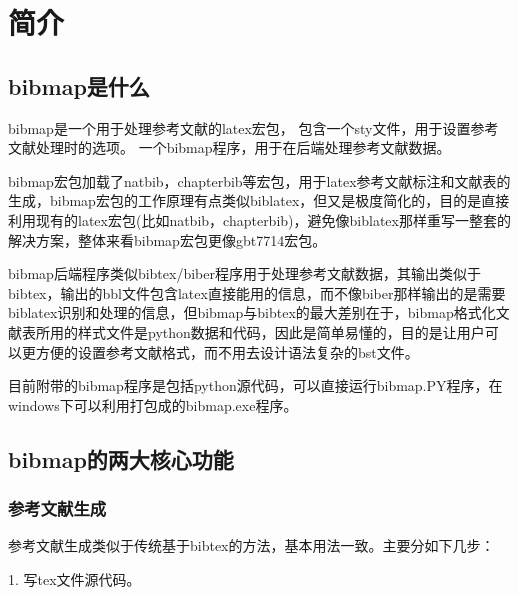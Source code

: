 \documentclass{article}
\begin{document}
\thispagestyle{empty}
\begin{center}

\vspace{0.3cm}


\end{center}

\section{简介}

\subsection{bibmap是什么}

bibmap是一个用于处理参考文献的latex宏包，
包含一个sty文件，用于设置参考文献处理时的选项。
一个bibmap程序，用于在后端处理参考文献数据。

bibmap宏包加载了natbib，chapterbib等宏包，用于latex参考文献标注和文献表的生成，bibmap宏包的工作原理有点类似biblatex，但又是极度简化的，目的是直接利用现有的latex宏包(比如natbib，chapterbib)，避免像biblatex那样重写一整套的解决方案，整体来看bibmap宏包更像gbt7714宏包。

bibmap后端程序类似bibtex/biber程序用于处理参考文献数据，其输出类似于bibtex，输出的bbl文件包含latex直接能用的信息，而不像biber那样输出的是需要biblatex识别和处理的信息，但bibmap与bibtex的最大差别在于，bibmap格式化文献表所用的样式文件是python数据和代码，因此是简单易懂的，目的是让用户可以更方便的设置参考文献格式，而不用去设计语法复杂的bst文件。

目前附带的bibmap程序是包括python源代码，可以直接运行bibmap.PY程序，在windows下可以利用打包成的bibmap.exe程序。

\subsection{bibmap的两大核心功能}

\subsubsection{参考文献生成}

参考文献生成类似于传统基于bibtex的方法，基本用法一致。主要分如下几步：

1. 写tex文件源代码。
\end{document}
